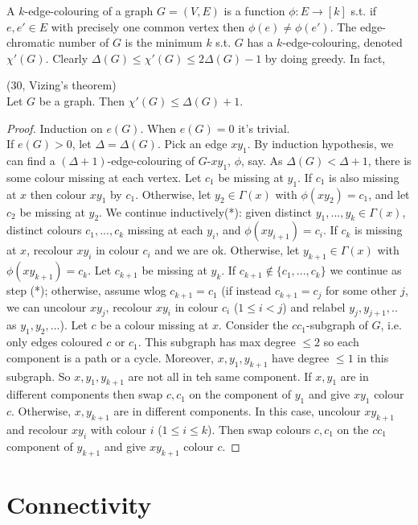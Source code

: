 \documentclass[a4paper]{article}
\begin{document}
A $k$-edge-colouring of a graph $G=(V,E)$ is a function $\phi:E \to [k]$ s.t. if $e,e' \in E$ with precisely one common vertex then $\phi(e) \neq \phi(e')$. The edge-chromatic number of $G$ is the minimum $k$ s.t. $G$ has a $k$-edge-colouring, denoted $\chi'(G)$. Clearly $\Delta(G) \leq \chi'(G) \leq 2\Delta(G) - 1$ by doing greedy. In fact,

\begin{thm} (30, Vizing's theorem)\\
Let $G$ be a graph. Then $\chi'(G) \leq \Delta(G) + 1$.
\begin{proof}
Induction on $e(G)$. When $e(G) = 0$ it's trivial.\\
If $e(G) > 0$, let $\Delta = \Delta(G)$. Pick an edge $xy_1$. By induction hypothesis, we can find a $(\Delta+1)$-edge-colouring of $G$-$xy_1$, $\phi$, say. As $\Delta(G) < \Delta+1$, there is some colour missing at each vertex. Let $c_1$ be missing at $y_1$. If $c_1$ is also missing at $x$ then colour $xy_1$ by $c_1$. Otherwise, let $y_2 \in \Gamma(x)$ with $\phi(xy_2) = c_1$, and let $c_2$ be missing at $y_2$. We continue inductively(*): given distinct $y_1,...,y_k \in \Gamma(x)$, distinct colours $c_1,...,c_k$ missing at each $y_i$, and $\phi(xy_{i+1}) = c_i$. If $c_k$ is missing at $x$, recolour $xy_i$ in colour $c_i$ and we are ok. Otherwise, let $y_{k+1} \in \Gamma(x)$ with $\phi(xy_{k+1}) = c_k$. Let $c_{k+1}$ be missing at $y_k$. If $c_{k+1} \not\in \{c_1,...,c_k\}$ we continue as step (*); otherwise, assume wlog $c_{k+1} = c_1$ (if instead $c_{k+1} = c_j$ for some other $j$, we can uncolour $xy_j$, recolour $xy_i$ in colour $c_i$ ($1 \leq i < j$) and relabel $y_j,y_{j+1},..$ as $y_1,y_2,...$). Let $c$ be a colour missing at $x$. Consider the $cc_1$-subgraph of $G$, i.e. only edges coloured $c$ or $c_1$. This subgraph has max degree $\leq 2$ so each component is a path or a cycle. Moreover, $x,y_1,y_{k+1}$ have degree $\leq 1$ in this subgraph. So $x,y_1, y_{k+1}$ are not all in teh same component. If $x,y_1$ are in different components then swap $c,c_1$ on the component of $y_1$ and give $xy_1$ colour $c$. Otherwise, $x,y_{k+1}$ are in different components. In this case, uncolour $xy_{k+1}$ and recolour $xy_i$ with colour $i$ ($1 \leq i \leq k$). Then swap colours $c,c_1$ on the $cc_1$ component of $y_{k+1}$ and give $xy_{k+1}$ colour $c$.
\end{proof}
\end{thm}

\newpage

\section{Connectivity}
\end{document}
